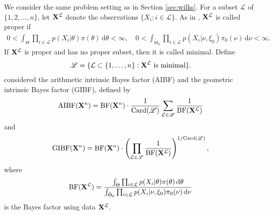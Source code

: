 \documentclass[11pt]{article}
\theoremstyle{plain}
\theoremstyle{definition}
\theoremstyle{remark}
\begin{document}
\begin{appendices}
We consider the same problem setting as in Section \ref{sec:wilks}.
For a subset $\mathcal L $ of $\{1, 2, \dots, n\}$, let $\mathbf{X}^{\mathcal L}$ denote the observations $\{X_i: i \in \mathcal L\}$.
As in \cite{intrinsicBayesFactor}, $\mathbf{X}^{\mathcal L}$ is called proper if 
\begin{align*}
    0< \int_{\Theta} \prod_{i \in \mathcal L} p (X_i | \theta) \pi(\theta) \, \mathrm d \theta  < \infty,
    \quad
    0< \int_{\tilde \Theta_0} \prod_{i \in \mathcal L} p (X_i | \nu, \xi_0) \pi_0(\nu) \, \mathrm d \nu  < \infty.
\end{align*}
If $\mathbf{X}^{\mathcal L}$ is proper and has no proper subset, then it is called minimal.
Define 
\begin{align*}
\mathscr L = \{ \mathcal L \subset \{1,\dots, n\} : \mathbf{X}^{\mathcal L} \text{ is minimal}\}.
\end{align*}
\cite{intrinsicBayesFactor} considered the arithmetic intrinsic Bayes factor (AIBF) and the geometric intrinsic Bayes factor (GIBF), defined by
\begin{align*}
    \text{AIBF}(\mathbf{X}^n) = 
    \text{BF}(\mathbf{X}^n) \cdot
    \frac{1}{\text{Card}(\mathscr L)} \sum_{\mathcal L \in \mathscr L} \frac{1}{ \text{BF}(\mathbf{X}^{\mathcal L}) }
\end{align*}
and
\begin{align*}
    \text{GIBF}(\mathbf{X}^n) = 
    \text{BF}(\mathbf{X}^n) \cdot
    \left(\prod_{\mathcal L \in \mathscr L} \frac{1}{ \text{BF}(\mathbf{X}^{\mathcal L}) } \right)^{1/\text{Card}(\mathscr L)},
\end{align*}
where 
\begin{align*}
\text{BF}(\mathbf{X}^{\mathcal L})
=
\frac{\int_{\Theta} \prod_{i \in \mathcal L} p(X_i|\theta)\pi(\theta)\, \mathrm d\theta}
{\int_{\tilde{\Theta}_0} \prod_{ i \in \mathcal L } p(X_i|\nu,\xi_0)\pi_0(\nu)\, \mathrm d\nu}
\end{align*}
is the Bayes factor using data $\mathbf{X}^{\mathcal L}$.


\end{appendices}
\end{document}
